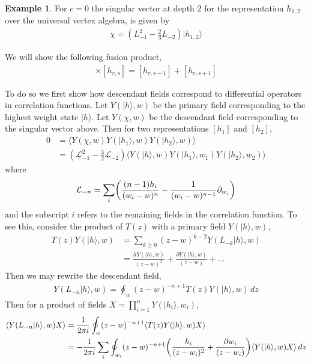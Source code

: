 \documentclass[a4paper,reqno,12pt]{report}
\theoremstyle{definition}
\newtheorem{exmp}{Example}[section]
\newcommand{\bra}{\langle}
\newcommand{\ket}{\rangle}
\numberwithin{equation}{section}
\let\originalleft\left     %
\let\originalright\right
\renewcommand{\left}{\mathopen{}\mathclose\bgroup\originalleft}
\renewcommand{\right}{\aftergroup\egroup\originalright}
\renewcommand{\ge}{\geqslant}
\theoremstyle{plain}
\begin{document}
\begin{exmp}
For $c=0$ the singular vector at depth $2$ for the representation $h_{1,2}$ over the universal vertex algebra, is given by
\begin{align*}
\chi = (L_{-1}^2 - \frac{2}{3}L_{-2})|h_{1,2}\ket
\end{align*}

We will show the following fusion product,
\begin{align}
[h_{1,2}] \times [h_{r,s}] = [h_{r,s-1}] + [h_{r,s+1}] \label{eqn:h12frule}
\end{align}

To do so we first show how descendant fields correspond to differential operators in correlation functions. Let $Y(|h\ket,w)$ be the primary field corresponding to the highest weight state $|h\ket$. Let $Y(\chi,w)$ be the descendant field corresponding to the singular vector above. Then for two representations $[h_1]$ and $[h_2]$,
\begin{align}
0 &= \bra Y(\chi,w) Y(|h_{1}\ket,w) Y(|h_{2}\ket,w) \ket \\
  &= (\mathcal{L}_{-1}^2 - \frac{3}{2}\mathcal{L}_{-2}) \bra  Y(|h\ket,w) Y(|h_{1}\ket,w_1) Y(|h_{2}\ket,w_2) \ket \label{eqn:CorDE}
\end{align}
where
\begin{align*}
\mathcal{L}_{-n}  = \sum_i \left(\frac{(n-1)h_i}{(w_i-w)^n}-\frac{1}{(w_i-w)^{n-1}}\partial_{ w_i}\right)
\end{align*}
and the subscript $i$ refers to the remaining fields in the correlation function. To see this, consider the product of $T(z)$ with a primary field $Y(|h\ket,w)$,
\begin{align}\label{eqn:TPFope}
T(z)Y(|h\ket, w) &= \sum_{k\ge 0} (z-w)^{k-2} Y(L_{-k}|h\ket,w)\\
&= \frac{hY(|h\ket, w)}{(z-w)^2} + \frac{\partial Y(|h\ket, w)}{(z-w)} + \dots
\end{align}
Then we may rewrite the descendant field,
\begin{align*}
Y(L_{-n}|h\ket,w) = \oint_w (z-w)^{-n+1} T(z)Y(|h\ket,w) \, dz
\end{align*}
Then for a product of fields $X=\prod_{i=1}^n Y(|h_i\ket,w_i)$,
\begin{align*}
\bra Y(L_{-n}|h\ket,w) X \ket &= \frac{1}{2\pi i}\oint_w (z-w)^{-n+1}\bra T(z) Y(|h\ket, w) X \ket\\ 
&= -\frac{1}{2\pi i}\sum_i  \oint_{w_i} (z-w)^{-n+1}\left(\frac{h_i}{(z-w_i)^2} + \frac{\partial w_i}{(z-w_i)} \right) \bra Y(|h\ket, w) X \ket \, dz\\

\end{align*}
\end{exmp}
\end{document}

